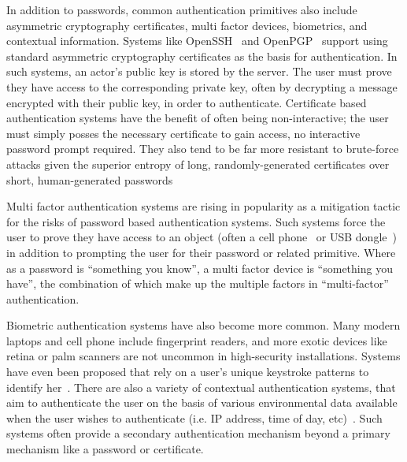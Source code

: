 In addition to passwords, common authentication primitives also
include asymmetric cryptography certificates, multi factor devices,
biometrics, and contextual information. Systems like
OpenSSH~\cite{openSSH} and OpenPGP~\cite{openpgp} support using
standard asymmetric cryptography certificates as the basis for
authentication. In such systems, an actor's public key is stored by
the server. The user must prove they have access to the corresponding
private key, often by decrypting a message encrypted with their public
key, in order to authenticate. Certificate based authentication
systems have the benefit of often being non-interactive; the user must
simply posses the necessary certificate to gain access, no interactive
password prompt required. They also tend to be far more resistant to
brute-force attacks given the superior entropy of long,
randomly-generated certificates over short, human-generated passwords

Multi factor authentication systems are rising in popularity as a
mitigation tactic for the risks of password based authentication
systems. Such systems force the user to prove they have access to an
object (often a cell phone~\cite{google-auth} or USB
dongle~\cite{yubikey}) in addition to prompting the user for their
password or related primitive. Where as a password is ``something you
know'', a multi factor device is ``something you have'', the
combination of which make up the multiple factors in ``multi-factor''
authentication.

Biometric authentication systems have also become more common. Many
modern laptops and cell phone include fingerprint readers, and more
exotic devices like retina or palm scanners are not uncommon in
high-security installations. Systems have even been proposed that rely
on a user's unique keystroke patterns to identify
her~\cite{Peacock2004}. There are also a variety of contextual
authentication systems, that aim to authenticate the user on the basis
of various environmental data available when the user wishes to
authenticate (i.e. IP address, time of day,
etc)~\cite{Hulsebosch2005}. Such systems often provide a secondary
authentication mechanism beyond a primary mechanism like a password or
certificate.

